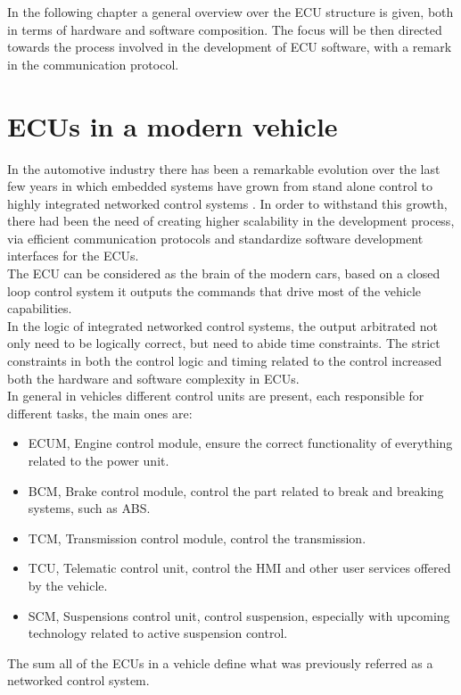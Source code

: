 \documentclass[../main.tex]{subfiles}
\begin{document}
In the following chapter a general overview over the ECU structure is given, both in terms of hardware and software composition. The focus will be then directed towards the process involved in the development of \gls{ECU} software, with a remark in the communication protocol.
\section{ECUs in a modern vehicle}
In the automotive industry there has been a remarkable evolution over the last few years in which embedded systems have grown from stand alone control to highly integrated networked control systems \cite{Johansson_vehicleapplications}. In order to withstand this growth, there had been the need of creating higher scalability in the development process, via efficient communication protocols and standardize software development interfaces for the \gls{ECU}s.\\
The \gls{ECU} can be considered as the brain of the modern cars, based on a closed loop control system it outputs the commands that drive most of the vehicle capabilities.\\
In the logic of integrated networked control systems, the output arbitrated not only need to be logically correct, but need to abide time constraints. The strict constraints in both the control logic and timing related to the control increased both the hardware and software complexity in \gls{ECU}s.\\
In general in vehicles different control units are present, each responsible for different tasks, the main ones are:
\begin{itemize}
    \item \gls{ECUM}, Engine control module, ensure the correct functionality of everything related to the power unit.
    \item \gls{BCM}, Brake control module, control the part related to break and breaking systems, such as \gls{ABS}.
    \item \gls{TCM}, Transmission control module, control the transmission.
    \item \gls{TCU}, Telematic control unit, control the \gls{HMI} and other user services offered by the vehicle. 
    \item \gls{SCM}, Suspensions control unit, control suspension, especially with upcoming technology related to active suspension control. 
\end{itemize}
The sum all of the \gls{ECU}s in a vehicle define what was previously referred as a networked control system.
\end{document}
